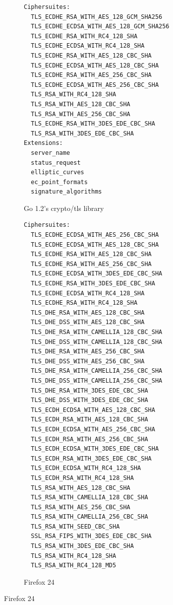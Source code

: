 \documentclass[conference]{IEEEtran}
\begin{document}
\begin{figure}
\centering
\begin{subfigure}[t]{0.30\textwidth}
\caption{Go 1.2's crypto/tls library}
\begin{minipage}[t][25.5ex][t]{\textwidth}
\tiny
\begin{verbatim}
Ciphersuites:
  TLS_ECDHE_RSA_WITH_AES_128_GCM_SHA256
  TLS_ECDHE_ECDSA_WITH_AES_128_GCM_SHA256
  TLS_ECDHE_RSA_WITH_RC4_128_SHA
  TLS_ECDHE_ECDSA_WITH_RC4_128_SHA
  TLS_ECDHE_RSA_WITH_AES_128_CBC_SHA
  TLS_ECDHE_ECDSA_WITH_AES_128_CBC_SHA
  TLS_ECDHE_RSA_WITH_AES_256_CBC_SHA
  TLS_ECDHE_ECDSA_WITH_AES_256_CBC_SHA
  TLS_RSA_WITH_RC4_128_SHA
  TLS_RSA_WITH_AES_128_CBC_SHA
  TLS_RSA_WITH_AES_256_CBC_SHA
  TLS_ECDHE_RSA_WITH_3DES_EDE_CBC_SHA
  TLS_RSA_WITH_3DES_EDE_CBC_SHA
Extensions:
  server_name
  status_request
  elliptic_curves
  ec_point_formats
  signature_algorithms
\end{verbatim}
\end{minipage}
\label{fig:ciphersuites:golang}
\end{subfigure}
%
\begin{subfigure}[t]{0.30\textwidth}
\caption{Firefox 24}
\begin{minipage}[t][57ex][t]{\textwidth}
\tiny
\begin{verbatim}
Ciphersuites:
  TLS_ECDHE_ECDSA_WITH_AES_256_CBC_SHA
  TLS_ECDHE_ECDSA_WITH_AES_128_CBC_SHA
  TLS_ECDHE_RSA_WITH_AES_128_CBC_SHA
  TLS_ECDHE_RSA_WITH_AES_256_CBC_SHA
  TLS_ECDHE_ECDSA_WITH_3DES_EDE_CBC_SHA
  TLS_ECDHE_RSA_WITH_3DES_EDE_CBC_SHA
  TLS_ECDHE_ECDSA_WITH_RC4_128_SHA
  TLS_ECDHE_RSA_WITH_RC4_128_SHA
  TLS_DHE_RSA_WITH_AES_128_CBC_SHA
  TLS_DHE_DSS_WITH_AES_128_CBC_SHA
  TLS_DHE_RSA_WITH_CAMELLIA_128_CBC_SHA
  TLS_DHE_DSS_WITH_CAMELLIA_128_CBC_SHA
  TLS_DHE_RSA_WITH_AES_256_CBC_SHA
  TLS_DHE_DSS_WITH_AES_256_CBC_SHA
  TLS_DHE_RSA_WITH_CAMELLIA_256_CBC_SHA
  TLS_DHE_DSS_WITH_CAMELLIA_256_CBC_SHA
  TLS_DHE_RSA_WITH_3DES_EDE_CBC_SHA
  TLS_DHE_DSS_WITH_3DES_EDE_CBC_SHA
  TLS_ECDH_ECDSA_WITH_AES_128_CBC_SHA
  TLS_ECDH_RSA_WITH_AES_128_CBC_SHA
  TLS_ECDH_ECDSA_WITH_AES_256_CBC_SHA
  TLS_ECDH_RSA_WITH_AES_256_CBC_SHA
  TLS_ECDH_ECDSA_WITH_3DES_EDE_CBC_SHA
  TLS_ECDH_RSA_WITH_3DES_EDE_CBC_SHA
  TLS_ECDH_ECDSA_WITH_RC4_128_SHA
  TLS_ECDH_RSA_WITH_RC4_128_SHA
  TLS_RSA_WITH_AES_128_CBC_SHA
  TLS_RSA_WITH_CAMELLIA_128_CBC_SHA
  TLS_RSA_WITH_AES_256_CBC_SHA
  TLS_RSA_WITH_CAMELLIA_256_CBC_SHA
  TLS_RSA_WITH_SEED_CBC_SHA
  SSL_RSA_FIPS_WITH_3DES_EDE_CBC_SHA
  TLS_RSA_WITH_3DES_EDE_CBC_SHA
  TLS_RSA_WITH_RC4_128_SHA
  TLS_RSA_WITH_RC4_128_MD5

\end{verbatim}
\end{minipage}
\end{subfigure}
\end{figure}
\end{document}
